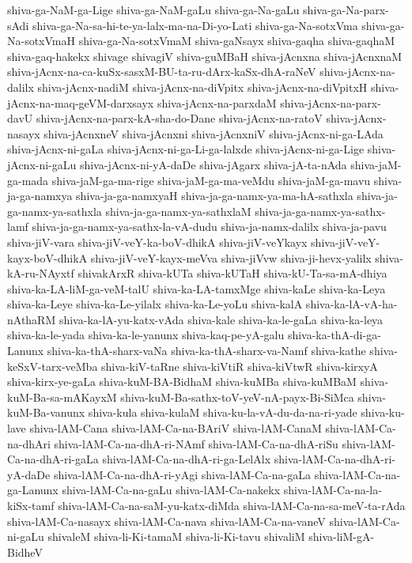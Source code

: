 {shiva-ga-NaM-ga-Lige
shiva-ga-NaM-gaLu
shiva-ga-Na-gaLu
shiva-ga-Na-parx-sAdi
shiva-ga-Na-sa-hi-te-ya-lalx-ma-na-Di-yo-Lati
shiva-ga-Na-sotxVma
shiva-ga-Na-sotxVmaH
shiva-ga-Na-sotxVmaM
shiva-gaNsayx
shiva-gaqha
shiva-gaqhaM
shiva-gaq-hakekx
shivage
shivagiV
shiva-guMBaH
shiva-jAcnxna
shiva-jAcnxnaM
shiva-jAcnx-na-ca-kuSx-sasxM-BU-ta-ru-dArx-kaSx-dhA-raNeV
shiva-jAcnx-na-dalilx
shiva-jAcnx-nadiM
shiva-jAcnx-na-diVpitx
shiva-jAcnx-na-diVpitxH
shiva-jAcnx-na-maq-geVM-darxsayx
shiva-jAcnx-na-parxdaM
shiva-jAcnx-na-parx-davU
shiva-jAcnx-na-parx-kA-sha-do-Dane
shiva-jAcnx-na-ratoV
shiva-jAcnx-nasayx
shiva-jAcnxneV
shiva-jAcnxni
shiva-jAcnxniV
shiva-jAcnx-ni-ga-LAda
shiva-jAcnx-ni-gaLa
shiva-jAcnx-ni-ga-Li-ga-lalxde
shiva-jAcnx-ni-ga-Lige
shiva-jAcnx-ni-gaLu
shiva-jAcnx-ni-yA-daDe
shiva-jAgarx
shiva-jA-ta-nAda
shiva-jaM-ga-mada
shiva-jaM-ga-ma-rige
shiva-jaM-ga-ma-veMdu
shiva-jaM-ga-mavu
shiva-ja-ga-namxya
shiva-ja-ga-namxyaH
shiva-ja-ga-namx-ya-ma-hA-sathxla
shiva-ja-ga-namx-ya-sathxla
shiva-ja-ga-namx-ya-sathxlaM
shiva-ja-ga-namx-ya-sathx-lamf
shiva-ja-ga-namx-ya-sathx-la-vA-dudu
shiva-ja-namx-dalilx
shiva-ja-pavu
shiva-jiV-vara
shiva-jiV-veY-ka-boV-dhikA
shiva-jiV-veYkayx
shiva-jiV-veY-kayx-boV-dhikA
shiva-jiV-veY-kayx-meVva
shiva-jiVvw
shiva-ji-hevx-yalilx
shiva-kA-ru-NAyxtf
shivakArxR
shiva-kUTa
shiva-kUTaH
shiva-kU-Ta-sa-mA-dhiya
shiva-ka-LA-liM-ga-veM-talU
shiva-ka-LA-tamxMge
shiva-kaLe
shiva-ka-Leya
shiva-ka-Leye
shiva-ka-Le-yilalx
shiva-ka-Le-yoLu
shiva-kalA
shiva-ka-lA-vA-ha-nAthaRM
shiva-ka-lA-yu-katx-vAda
shiva-kale
shiva-ka-le-gaLa
shiva-ka-leya
shiva-ka-le-yada
shiva-ka-le-yanunx
shiva-kaq-pe-yA-galu
shiva-ka-thA-di-ga-Lanunx
shiva-ka-thA-sharx-vaNa
shiva-ka-thA-sharx-va-Namf
shiva-kathe
shiva-keSxV-tarx-veMba
shiva-kiV-taRne
shiva-kiVtiR
shiva-kiVtwR
shiva-kirxyA
shiva-kirx-ye-gaLa
shiva-kuM-BA-BidhaM
shiva-kuMBa
shiva-kuMBaM
shiva-kuM-Ba-sa-mAKayxM
shiva-kuM-Ba-sathx-toV-yeV-nA-payx-Bi-SiMca
shiva-kuM-Ba-vanunx
shiva-kula
shiva-kulaM
shiva-ku-la-vA-du-da-na-ri-yade
shiva-ku-lave
shiva-lAM-Cana
shiva-lAM-Ca-na-BAriV
shiva-lAM-CanaM
shiva-lAM-Ca-na-dhAri
shiva-lAM-Ca-na-dhA-ri-NAmf
shiva-lAM-Ca-na-dhA-riSu
shiva-lAM-Ca-na-dhA-ri-gaLa
shiva-lAM-Ca-na-dhA-ri-ga-LelAlx
shiva-lAM-Ca-na-dhA-ri-yA-daDe
shiva-lAM-Ca-na-dhA-ri-yAgi
shiva-lAM-Ca-na-gaLa
shiva-lAM-Ca-na-ga-Lanunx
shiva-lAM-Ca-na-gaLu
shiva-lAM-Ca-nakekx
shiva-lAM-Ca-na-la-kiSx-tamf
shiva-lAM-Ca-na-saM-yu-katx-diMda
shiva-lAM-Ca-na-sa-meV-ta-rAda
shiva-lAM-Ca-nasayx
shiva-lAM-Ca-nava
shiva-lAM-Ca-na-vaneV
shiva-lAM-Ca-ni-gaLu
shivaleM
shiva-li-Ki-tamaM
shiva-li-Ki-tavu
shivaliM
shiva-liM-gA-BidheV
}
